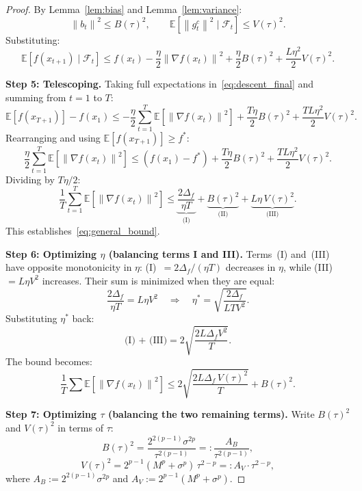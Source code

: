 \documentclass[11pt]{article}
\theoremstyle{definition}
\newcommand{\E}{\mathbb{E}}
\newcommand{\norm}[1]{\left\| #1 \right\|}
\newcommand{\Filt}{\mathcal{F}}
\begin{document}
\begin{proof}
By Lemma~\ref{lem:bias} and Lemma~\ref{lem:variance}:
\[
  \norm{b_t}^2 \leq B(\tau)^2, \qquad
  \E[\norm{g_t^c}^2 \mid \Filt_t] \leq V(\tau)^2.
\]
Substituting:
\begin{equation}\label{eq:descent_final}
  \E[f(x_{t+1}) \mid \Filt_t]
  \leq f(x_t) - \frac{\eta}{2}\norm{\nabla f(x_t)}^2
    + \frac{\eta}{2}B(\tau)^2
    + \frac{L\eta^2}{2}V(\tau)^2.
\end{equation}

\medskip
\textbf{Step 5: Telescoping.}
Taking full expectations in~\eqref{eq:descent_final} and summing from $t = 1$ to $T$:
\[
  \E[f(x_{T+1})] - f(x_1) \leq
    -\frac{\eta}{2}\sum_{t=1}^T \E\!\left[\norm{\nabla f(x_t)}^2\right]
    + \frac{T\eta}{2}B(\tau)^2 + \frac{TL\eta^2}{2}V(\tau)^2.
\]
Rearranging and using $\E[f(x_{T+1})] \geq f^*$:
\[
  \frac{\eta}{2}\sum_{t=1}^T \E\!\left[\norm{\nabla f(x_t)}^2\right]
  \leq (f(x_1) - f^*) + \frac{T\eta}{2}B(\tau)^2 + \frac{TL\eta^2}{2}V(\tau)^2.
\]
Dividing by $T\eta/2$:
\begin{equation}\label{eq:prelim_bound}
  \frac{1}{T}\sum_{t=1}^T \E\!\left[\norm{\nabla f(x_t)}^2\right]
  \leq \underbrace{\frac{2\Delta_f}{\eta T}}_{\text{(I)}}
    + \underbrace{B(\tau)^2}_{\text{(II)}}
    + \underbrace{L\eta\, V(\tau)^2}_{\text{(III)}}.
\end{equation}
This establishes~\eqref{eq:general_bound}.

\medskip
\textbf{Step 6: Optimizing $\eta$ (balancing terms I and III).}
Terms~(I) and~(III) have opposite monotonicity in $\eta$:
(I)~$= 2\Delta_f/(\eta T)$ decreases in $\eta$, while
(III)~$= L\eta V^2$ increases. Their sum is minimized when they are equal:
\[
  \frac{2\Delta_f}{\eta T} = L\eta V^2
  \quad\Longrightarrow\quad
  \eta^* = \sqrt{\frac{2\Delta_f}{L T V^2}}.
\]
Substituting $\eta^*$ back:
\[
  \text{(I) + (III)} = 2\sqrt{\frac{2L\Delta_f V^2}{T}}.
\]
The bound becomes:
\begin{equation}\label{eq:after_eta}
  \frac{1}{T}\sum \E\!\left[\norm{\nabla f(x_t)}^2\right]
  \leq 2\sqrt{\frac{2L\Delta_f\, V(\tau)^2}{T}} + B(\tau)^2.
\end{equation}

\medskip
\textbf{Step 7: Optimizing $\tau$ (balancing the two remaining terms).}
Write $B(\tau)^2$ and $V(\tau)^2$ in terms of $\tau$:
\[
  B(\tau)^2 = \frac{2^{2(p-1)}\sigma^{2p}}{\tau^{2(p-1)}}
  =: \frac{A_B}{\tau^{2(p-1)}},
\]
\[
  V(\tau)^2 = 2^{p-1}(M^p + \sigma^p)\,\tau^{2-p}
  =: A_V \cdot \tau^{2-p},
\]
where $A_B := 2^{2(p-1)}\sigma^{2p}$ and $A_V := 2^{p-1}(M^p + \sigma^p)$.


\end{proof}
\end{document}
